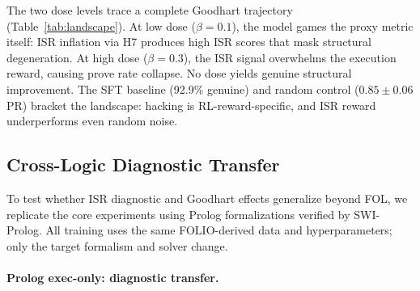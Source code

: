 The two dose levels trace a complete Goodhart trajectory (Table~\ref{tab:landscape}).
At low dose ($\beta{=}0.1$), the model games the proxy metric itself: ISR inflation via H7 produces high ISR scores that mask structural degeneration.
At high dose ($\beta{=}0.3$), the ISR signal overwhelms the execution reward, causing prove rate collapse.
No dose yields genuine structural improvement.
The SFT baseline (92.9\% genuine) and random control ($0.85 \pm 0.06$ PR) bracket the landscape: hacking is RL-reward-specific, and ISR reward underperforms even random noise.

\subsection{Cross-Logic Diagnostic Transfer}
\label{sec:cross-logic}

To test whether ISR diagnostic and Goodhart effects generalize beyond FOL, we replicate the core experiments using Prolog formalizations verified by SWI-Prolog.
All training uses the same FOLIO-derived data and hyperparameters; only the target formalism and solver change.

\paragraph{Prolog exec-only: diagnostic transfer.}

